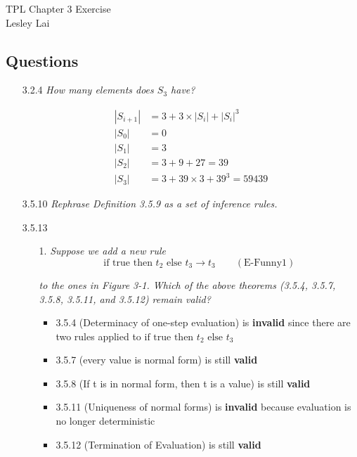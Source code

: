 \documentclass[12pt]{article}
\begin{document}
TPL \hfill Chapter 3 Exercise\\
Lesley Lai

\hrulefill

\subsection*{Questions}

\begin{enumerate}

\item[3.2.4] \textit{How many elements does $S_3$ have?}

\begin{align*}
|S_{i+1}| &= 3 + 3 \times |S_i| + |S_i|^3 \\
|S_0| &= 0 \\
|S_1| &= 3 \\
|S_2| &= 3 + 9 + 27 = 39 \\
|S_3| &= 3 + 39 \times 3 + 39^3 = 59439
\end{align*}

\item[3.5.10] \textit{Rephrase Definition 3.5.9 as a set of inference rules.}

\begin{mathpar}


\end{mathpar}

\newpage
\item[3.5.13]
\begin{enumerate}
\item[1.] \textit{Suppose we add a new rule}
$$
\text{if true then } t_2 \text{ else } t_3 \longrightarrow t_3 \qquad (\text {E-Funny1})
$$

\textit{to the ones in Figure 3-1. Which of the above theorems (3.5.4, 3.5.7, 3.5.8, 3.5.11, and 3.5.12) remain valid?}

\begin{itemize}
\item 3.5.4 (Determinacy of one-step evaluation) is \textbf{invalid} since there are two rules applied to $\text{if true then } t_2 \text{ else } t_3$
\item 3.5.7 (every value is normal form) is still \textbf{valid}
\item 3.5.8 (If t is in normal form, then t is a value) is still \textbf{valid}
\item 3.5.11 (Uniqueness of normal forms) is \textbf{invalid} because evaluation is no longer deterministic
\item 3.5.12 (Termination of Evaluation) is still \textbf{valid}
\end{itemize}


\end{enumerate}
\end{enumerate}
\end{document}
